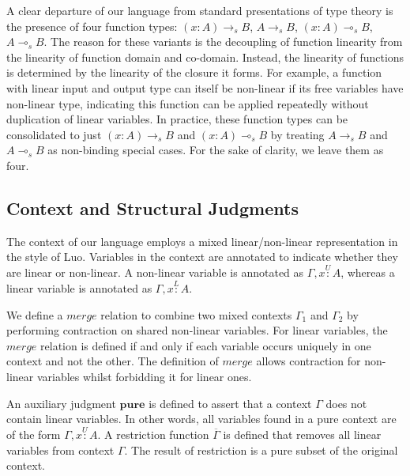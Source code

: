 \documentclass{article}
\newcommand{\pure}{\textbf{pure}}
\newcommand{\utype}{\overset{U}{:}}
\newcommand{\ltype}{\overset{L}{:}}
\begin{document}
  A clear departure of our language from standard presentations of type theory is the presence of four function types: $(x : A) \rightarrow_s B$, $A \rightarrow_s B$, $(x : A) \multimap_s B$, $A \multimap_s B$. The reason for these variants is the decoupling of function linearity from the linearity of function domain and co-domain. Instead, the linearity of functions is determined by the linearity of the closure it forms. For example, a function with linear input and output type can itself be non-linear if its free variables have non-linear type, indicating this function can be applied repeatedly without duplication of linear variables. In practice, these function types can be consolidated to just $(x : A) \rightarrow_s B$ and $(x : A) \multimap_s B$ by treating $A \rightarrow_s B$ and $A \multimap_s B$ as non-binding special cases. For the sake of clarity, we leave them as four.

  \subsection{Context and Structural Judgments}
  The context of our language employs a mixed linear/non-linear representation in the style of Luo\cite{luo}. Variables in the context are annotated to indicate whether they are linear or non-linear. A non-linear variable is annotated as $\Gamma, x \utype A$, whereas a linear variable is annotated as $\Gamma, x \ltype A$. 
  
  We define a $merge$ relation to combine two mixed contexts $\Gamma_1$ and $\Gamma_2$ by performing contraction on shared non-linear variables. For linear variables, the $merge$ relation is defined if and only if each variable occurs uniquely in one context and not the other. The definition of $merge$ allows contraction for non-linear variables whilst forbidding it for linear ones.

  An auxiliary judgment $\pure$ is defined to assert that a context $\Gamma$ does not contain linear variables. In other words, all variables found in a pure context are of the form $\Gamma, x \utype A$. A restriction function $\overline{\Gamma}$ is defined that removes all linear variables from context $\Gamma$. The result of restriction is a pure subset of the original context.
  
\end{document}
